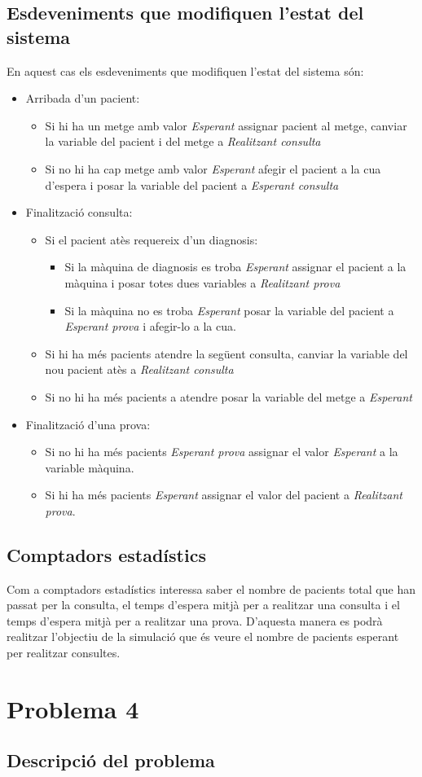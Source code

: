 \documentclass[a4paper]{article}
\begin{document}
\subsection{Esdeveniments que modifiquen l'estat del sistema}
En aquest cas els esdeveniments que modifiquen l'estat del sistema són:
\begin{itemize}
	\item Arribada d'un pacient: 
	\begin{itemize}
		\item Si hi ha un metge amb valor \emph{Esperant} assignar pacient al metge, canviar la variable del pacient i del metge a \emph{Realitzant consulta}
		\item Si no hi ha cap metge amb valor \emph{Esperant} afegir el pacient a la cua d'espera i posar la variable del pacient a \emph{Esperant consulta}
	\end{itemize}
	\item Finalització consulta:
	\begin{itemize}
		\item Si el pacient atès requereix d'un diagnosis:
		\begin{itemize}
			 \item Si la màquina de diagnosis es troba \emph{Esperant} assignar el pacient a la màquina i posar totes dues variables a \emph{Realitzant prova}
			 \item Si la màquina no es troba \emph{Esperant} posar la variable del pacient a \emph{Esperant prova} i afegir-lo a la cua.
		\end{itemize}
		\item Si hi ha més pacients atendre la següent consulta, canviar la variable del nou pacient atès a \emph{Realitzant consulta}
		\item Si no hi ha més pacients a atendre posar la variable del metge a \emph{Esperant}
	\end{itemize}
	\item Finalització d'una prova:
	\begin{itemize}
		\item Si no hi ha més pacients \emph{Esperant prova} assignar el valor \emph{Esperant} a la variable màquina.
		\item Si hi ha més pacients \emph{Esperant} assignar el valor del pacient a \emph{Realitzant prova}.
	\end{itemize}
\end{itemize}

\subsection{Comptadors estadístics}
Com a comptadors estadístics interessa saber el nombre de pacients total que han passat per la consulta, el temps d'espera mitjà per a realitzar una consulta i el temps d'espera mitjà per a realitzar una prova. D'aquesta manera es podrà realitzar l'objectiu de la simulació que és veure el nombre de pacients esperant per realitzar consultes.


\section{Problema 4}
\subsection{Descripció del problema}
\end{document}
